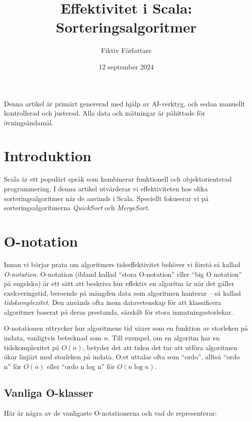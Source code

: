 \documentclass[a4paper,12pt]{article}   %
\title{Effektivitet i Scala: Sorteringsalgoritmer}
\author{Fiktiv Författare}
\date{12 september 2024}
\begin{document}
\maketitle              %

\begin{tcolorbox}[title=Notera]
    Denna artikel är primärt genererad med hjälp av AI-verktyg, och sedan manuellt kontrollerad och justerad. Alla data och mätningar är påhittade för övningsändamål.
\end{tcolorbox}

\section{Introduktion}

Scala är ett populärt språk som kombinerar funktionell och objektorienterad programmering. I denna artikel utvärderar vi effektiviteten hos olika sorteringsalgoritmer när de används i Scala. Speciellt fokuserar vi på sorteringsalgoritmerna \emph{QuickSort} och \emph{MergeSort}.

\section{O-notation}

Innan vi börjar prata om algoritmers tidseffektivitet behöver vi förstå så kallad \emph{O-notation}. O-notation (ibland kallad \enquote{stora O-notation} eller \enquote{big O notation} på engelska) är ett sätt att beskriva hur effektiv en algoritm är när det gäller exekveringstid, beroende på mängden data som algoritmen hanterar -- så kallad \emph{tidskomplexitet}. Den används ofta inom datavetenskap för att klassificera algoritmer baserat på deras prestanda, särskilt för stora inmatningsstorlekar.

O-notationen uttrycker hur algoritmens tid växer som en funktion av storleken på indata, vanligtvis betecknad som $n$. Till exempel, om en algoritm har en tidskomplexitet på $O(n)$, betyder det att tiden det tar att utföra algoritmen ökar linjärt med storleken på indata. O:et uttalas ofta som \enquote{ordo}, alltså \enquote{ordo n} för $O(n)$ eller \enquote{ordo n log n} för $O(n \log n)$.

\subsection{Vanliga O-klasser}

Här är några av de vanligaste O-notationerna och vad de representerar:
\end{document}
